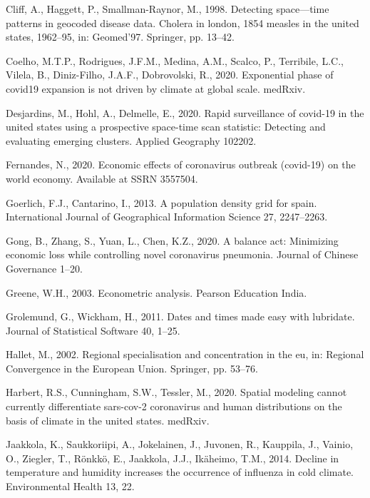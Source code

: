 \documentclass[]{elsarticle} %
\begin{document}
\leavevmode\hypertarget{ref-Cliff1998detecting}{}%
Cliff, A., Haggett, P., Smallman-Raynor, M., 1998. Detecting
space---time patterns in geocoded disease data. Cholera in london, 1854
measles in the united states, 1962--95, in: Geomed'97. Springer, pp.
13--42.

\leavevmode\hypertarget{ref-Coelho2020exponential}{}%
Coelho, M.T.P., Rodrigues, J.F.M., Medina, A.M., Scalco, P., Terribile,
L.C., Vilela, B., Diniz-Filho, J.A.F., Dobrovolski, R., 2020.
Exponential phase of covid19 expansion is not driven by climate at
global scale. medRxiv.

\leavevmode\hypertarget{ref-Desjardins2020rapid}{}%
Desjardins, M., Hohl, A., Delmelle, E., 2020. Rapid surveillance of
covid-19 in the united states using a prospective space-time scan
statistic: Detecting and evaluating emerging clusters. Applied Geography
102202.

\leavevmode\hypertarget{ref-Fernandes2020economic}{}%
Fernandes, N., 2020. Economic effects of coronavirus outbreak (covid-19)
on the world economy. Available at SSRN 3557504.

\leavevmode\hypertarget{ref-Goerlich2013population}{}%
Goerlich, F.J., Cantarino, I., 2013. A population density grid for
spain. International Journal of Geographical Information Science 27,
2247--2263.

\leavevmode\hypertarget{ref-Gong2020balance}{}%
Gong, B., Zhang, S., Yuan, L., Chen, K.Z., 2020. A balance act:
Minimizing economic loss while controlling novel coronavirus pneumonia.
Journal of Chinese Governance 1--20.

\leavevmode\hypertarget{ref-Greene2003econometric}{}%
Greene, W.H., 2003. Econometric analysis. Pearson Education India.

\leavevmode\hypertarget{ref-Grolemund2011dates}{}%
Grolemund, G., Wickham, H., 2011. Dates and times made easy with
lubridate. Journal of Statistical Software 40, 1--25.

\leavevmode\hypertarget{ref-Hallet2002regional}{}%
Hallet, M., 2002. Regional specialisation and concentration in the eu,
in: Regional Convergence in the European Union. Springer, pp. 53--76.

\leavevmode\hypertarget{ref-Harbert2020spatial}{}%
Harbert, R.S., Cunningham, S.W., Tessler, M., 2020. Spatial modeling
cannot currently differentiate sars-cov-2 coronavirus and human
distributions on the basis of climate in the united states. medRxiv.

\leavevmode\hypertarget{ref-Jaakkola2014decline}{}%
Jaakkola, K., Saukkoriipi, A., Jokelainen, J., Juvonen, R., Kauppila,
J., Vainio, O., Ziegler, T., Rönkkö, E., Jaakkola, J.J., Ikäheimo, T.M.,
2014. Decline in temperature and humidity increases the occurrence of
influenza in cold climate. Environmental Health 13, 22.
\end{document}
